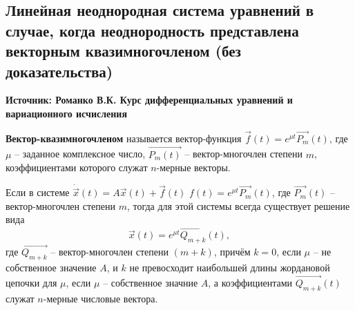 \subsection{Линейная неоднородная система уравнений в случае, когда неоднородность представлена векторным квазимногочленом (без доказательства)}

\textbf{Источник: Романко В.К. Курс дифференциальных уравнений и вариационного исчисления}

\begin{definition}
  \textbf{Вектор-квазимногочленом} называется вектор-функция $\overrightarrow{f}(t) = e^{\mu t} \overrightarrow{P_m}(t)$, где $\mu$ -- заданное комплексное число, $\overrightarrow{P_m(t)}$ -- вектор-многочлен степени $m$, коэффициентами которого служат $n$-мерные векторы. 
\end{definition}

\begin{theorem}
  Если в системе $\dot{\overrightarrow{x}}(t) = A \overrightarrow{x}(t) + \overrightarrow{f}(t)$ $f(t) = e^{\mu t} \overrightarrow{P_m}(t)$, где $\overrightarrow{P_m}(t)$ -- вектор-многочлен степени $m$, тогда для этой системы всегда существует решение вида
  \[ \overrightarrow{x}(t) = e^{\mu t} \overrightarrow{Q_{m+k}}(t),\]
  где $\overrightarrow{Q_{m+k}}$ -- вектор-многочлен степени $(m + k)$, причём $k = 0$, если $\mu$ -- не собственное значение $A$, и $k$ не превосходит наибольшей длины жордановой цепочки для $\mu$, если $\mu$ -- собственное значние $A$, а коэффициентами $\overrightarrow{Q_{m+k}}(t)$ служат $n$-мерные числовые вектора.
\end{theorem}
